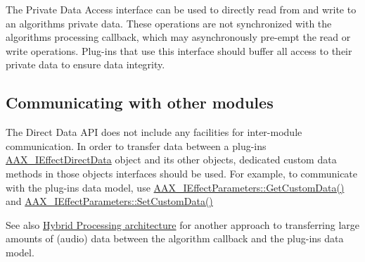 The Private Data Access interface can be used to directly read from and write to an algorithm\textquotesingle{}s private data. These operations are not synchronized with the algorithm\textquotesingle{}s processing callback, which may asynchronously pre-\/empt the read or write operations. Plug-\/ins that use this interface should buffer all access to their private data to ensure data integrity.\hypertarget{a00333_auxinterface_directdata_modulecommunication}{}\subsection{Communicating with other modules}\label{a00333_auxinterface_directdata_modulecommunication}
The Direct Data A\+P\+I does not include any facilities for inter-\/module communication. In order to transfer data between a plug-\/in\textquotesingle{}s \hyperlink{a00097}{A\+A\+X\+\_\+\+I\+Effect\+Direct\+Data} object and its other objects, dedicated custom data methods in those objects\textquotesingle{} interfaces should be used. For example, to communicate with the plug-\/in\textquotesingle{}s data model, use \hyperlink{a00061_a4728fcad006d921a07489144360f447e}{A\+A\+X\+\_\+\+I\+Effect\+Parameters\+::\+Get\+Custom\+Data()} and \hyperlink{a00061_aa838cad04781853ef2e0b9df22a05170}{A\+A\+X\+\_\+\+I\+Effect\+Parameters\+::\+Set\+Custom\+Data()}

\begin{DoxySeeAlso}{See also}
\hyperlink{a00335}{Hybrid Processing architecture} for another approach to transferring large amounts of (audio) data between the algorithm callback and the plug-\/in\textquotesingle{}s data model. 
\end{DoxySeeAlso}
